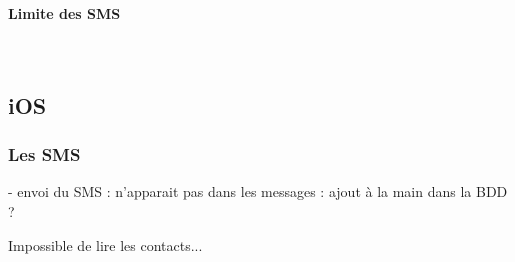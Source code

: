 \paragraph{Limite des SMS}
~~\\




\subsection{iOS}




\subsubsection{Les SMS}

- envoi du SMS : n'apparait pas dans les messages : ajout à la main dans la BDD ?

Impossible de lire les contacts...
\\
